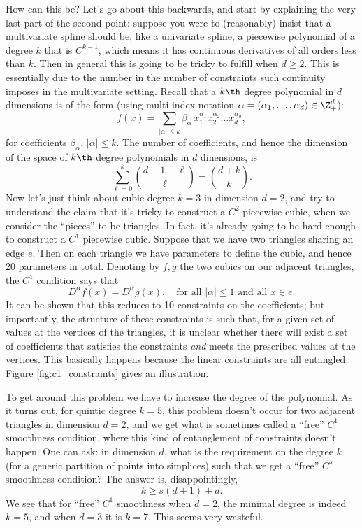 \documentclass{article}
\begin{document}
How can this be? Let's go about this backwards, and start by explaining the very
last part of the second point: suppose you were to (reasonably) insist that a 
multivariate spline should be, like a univariate spline, a piecewise polynomial
of a degree $k$ that is $C^{k-1}$, which means it has continuous derivatives of
all orders less than $k$. Then in general this is going to be tricky to fulfill
when $d \geq 2$. This is essentially due to the number in the number of
constraints such continuity imposes in the multivariate setting. Recall that a
$k\th$ degree polynomial in $d$ dimensions is of the form (using multi-index
notation $\alpha = (\alpha_1,\dots,\alpha_d) \in \Z^d_+$):
\begin{equation}
\label{eq:polynomial}
f(x) = \sum_{|\alpha| \leq k} \beta_\alpha \, x_1^{\alpha_1} x_2^{\alpha_2}
\dots x_d^{\alpha_d},
\end{equation}
for coefficients $\beta_\alpha$, $|\alpha| \leq k$. The number of coefficients,
and hence the dimension of the space of $k\th$ degree polynomials in $d$
dinensions, is
\[
\sum_{\ell=0}^k {d-1+\ell \choose \ell} = {d + k \choose k}.
\]
Now let's just think about cubic degree $k=3$ in dimension $d=2$, and try to  
understand the claim that it's tricky to construct a $C^2$ piecewise cubic,
when we consider the ``pieces'' to be triangles. In fact, it's already going to
be hard enough to construct a $C^1$ piecewise cubic. Suppose that we have two  
triangles sharing an edge $e$. Then on each triangle we have  parameters to define the cubic, and hence 20 parameters in
total. Denoting by $f,g$ the two cubics on our adjacent triangles, the $C^1$ 
condition says that
\[
D^\alpha f(x) = D^\alpha g(x), \quad \text{for all $|\alpha| \leq 1$ and all $x
  \in e$}. 
\] 
It can be shown that this reduces to 10 constraints on the coefficients; but
importantly, the structure of these constraints is such that, for a given set of
values at the vertices of the triangles, it is unclear whether there will exist
a set of coefficients that satisfies the constraints \emph{and} meets the
prescribed values at the vertices. This basically happens because the linear 
constraints are all entangled. Figure \ref{fig:c1_constraints} gives an
illustration.    

To get around this problem we have to increase the degree of the polynomial. As
it turns out, for quintic degree $k=5$, this problem doesn't occur for two
adjacent triangles in dimension $d=2$, and we get what is sometimes called a
``free'' $C^1$ smoothness condition, where this kind of entanglement of
constraints doesn't happen. One can ask: in dimension $d$, what is the
requirement on the degree $k$ (for a generic partition of points into simplices)
such that we get a ``free'' $C^s$ smoothness condition? The answer is,
disappointingly,              
\[
k \geq s(d+1) + d.
\]
We see that for ``free'' $C^1$ smoothness when $d=2$, the minimal degree is
indeed $k=5$, and when $d=3$ it is $k=7$. This seems very wasteful.   
\end{document}
